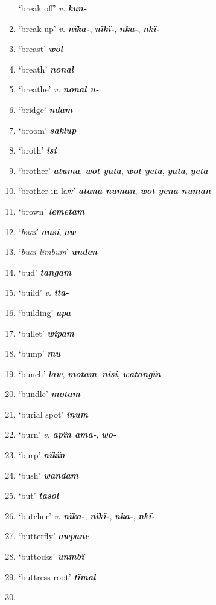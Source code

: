 \begin{enumerate}[noitemsep, label={}, align=left, widest=190, labelsep=1ex,leftmargin=*,itemindent=-10pt]
‘break off’ \textit{v.} \textbf{\textit{kun-}} \item
‘break up’ \textit{v.} \textbf{\textit{nïka-}}, \textbf{\textit{nïkï-}}, \textbf{\textit{nka-}}, \textbf{\textit{nkï-}} \item
‘breast’ \textbf{\textit{wol}} \item
‘breath’ \textbf{\textit{nonal}} \item
‘breathe’ \textit{v.} \textbf{\textit{nonal u-}} \item
‘bridge’ \textbf{\textit{ndam}} \item
‘broom’ \textbf{\textit{saklup}} \item
‘broth’ \textbf{\textit{isi}} \item
‘brother’ \textbf{\textit{atuma}}, \textbf{\textit{wot yata}}, \textbf{\textit{wot yeta}}, \textbf{\textit{yata}}, \textbf{\textit{yeta}} \item
‘brother-in-law’ \textbf{\textit{atana numan}}, \textbf{\textit{wot yena numan}} \item
‘brown’ \textbf{\textit{lemetam}} \item
‘\textit{buai}’ \textbf{\textit{ansi}}, \textbf{\textit{aw}} \item
‘\textit{buai limbum}’ \textbf{\textit{unden}} \item
‘bud’ \textbf{\textit{tangam}} \item
‘build’ \textit{v.} \textbf{\textit{ita-}} \item
‘building’ \textbf{\textit{apa}} \item
‘bullet’ \textbf{\textit{wipam}} \item
‘bump’ \textbf{\textit{mu}} \item
‘bunch’ \textbf{\textit{law}}, \textbf{\textit{motam}}, \textbf{\textit{nisi}}, \textbf{\textit{watangïn}} \item
‘bundle’ \textbf{\textit{motam}} \item
‘burial spot’ \textbf{\textit{inum}} \item
‘burn’ \textit{v.} \textbf{\textit{apïn ama-}}, \textbf{\textit{wo-}} \item
‘burp’ \textbf{\textit{nïkïn}} \item
‘bush’ \textbf{\textit{wandam}} \item
‘but’ \textbf{\textit{tasol}} \item
‘butcher’ \textit{v.} \textbf{\textit{nïka-}}, \textbf{\textit{nïkï-}}, \textbf{\textit{nka-}}, \textbf{\textit{nkï-}} \item
‘butterfly’ \textbf{\textit{awpane}} \item
‘buttocks’ \textbf{\textit{unmbï}} \item
‘buttress root’ \textbf{\textit{tïmal}}\\ \item


\end{enumerate}
